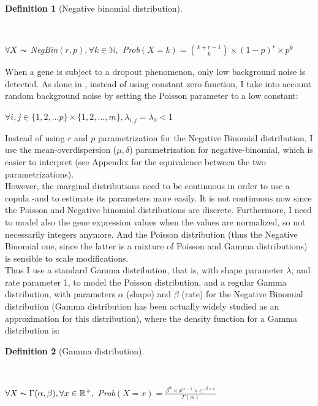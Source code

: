 \documentclass{report}
\newtheorem{definition}{Definition}[section]
\begin{document}
{\begin{definition}[Negative binomial distribution]\label{negativebinomial}{~\\\begin{center}$\forall X \thicksim$ \textit{NegBin}$(r, p), \forall k \in \mathbb{N},$ \textit{Prob}$(X = k) = {{k+r-1}\choose{k}} \times (1-p)^r \times p^k$\end{center}}\end{definition}

When a gene is subject to a dropout phenomenon, only low background noise is detected. As done in \cite{kharchenko2014bayesian}, instead of using constant zero function, I take into account random background noise by setting the Poisson parameter to a low constant:

\begin{center}
$\forall i,j \in \{1, 2, ... p\} \times \{1, 2, ..., m\}, \lambda_{i,j} = \lambda_0 < 1$\\
\end{center}

Instead of using $r$ and $p$ parametrization for the Negative Binomial distribution, I use the mean-overdispersion ($\mu, \delta$) parametrization for negative-binomial\cite{rodriguez2013models}, which is easier to interpret (see Appendix for the equivalence between the two parametrizations).\\

However, the marginal distributions need to be continuous in order to use a copula -and to estimate its parameters more easily. It is not continuous now since the Poisson and Negative binomial distributions are discrete. Furthermore, I need to model also the gene expression values when the values are normalized, so not necessarily integers anymore. And the Poisson distribution (thus the Negative Binomial one, since the latter is a mixture of Poisson and Gamma distributions) is sensible to scale modifications.\\

Thus I use a standard Gamma distribution, that is, with shape parameter $\lambda$, and rate parameter 1, to model the Poisson distribution, and a regular Gamma distribution, with parameters $\alpha$ (shape) and $\beta$ (rate) for the Negative Binomial distribution (Gamma distribution has been actually widely studied as an approximation for this distribution\cite{guenther1972simple}\cite{best1974improved}), where the density function for a Gamma distribution is:

\begin{definition}[Gamma distribution]\label{gamma}{~\\\begin{center}$\forall X \thicksim \Gamma(\alpha, \beta), \forall x \in \mathbb{R}^+,$ \textit{Prob}$(X = x) = \frac{\beta^{\alpha} \times x^{\alpha-1} \times e^{-\beta \times x}}{\Gamma(\alpha)}$\end{center}}\end{definition}

}
\end{document}
